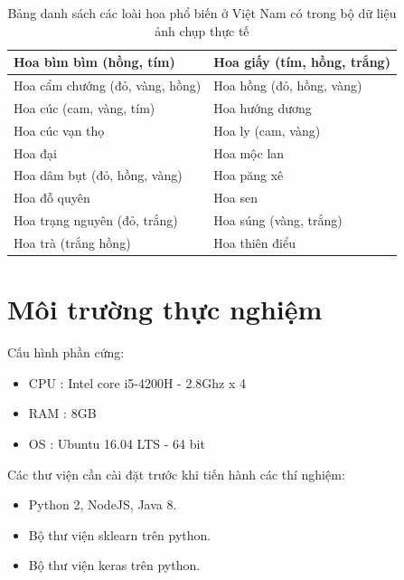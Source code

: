 \documentclass[12pt]{report}
\begin{document}
				
		\begin{table}[h]
			\centering
			\caption{Bảng danh sách các loài hoa phổ biến ở Việt Nam có trong bộ dữ liệu ảnh chụp thực tế}
			\label{tbl:table ket qua cua Nilsback08}
			\begin{tabular}{|l|l|}
				\hline
				Hoa bìm bìm (hồng, tím)               & Hoa giấy (tím, hồng, trắng) \\ \hline
				Hoa cẩm chướng (đỏ, vàng, hồng) & Hoa hồng (đỏ, hồng, vàng)  \\ \hline
				Hoa cúc (cam, vàng, tím)                & Hoa hướng dương        \\ \hline       
				Hoa cúc vạn thọ                       & Hoa ly (cam, vàng)           \\ \hline     
				Hoa đại                                 & Hoa mộc lan               \\ \hline       
				Hoa dâm bụt (đỏ, hồng, vàng)      & Hoa păng xê                     \\ \hline 
				Hoa đỗ quyên                         & Hoa sen                      \\ \hline      
				Hoa trạng nguyên (đỏ, trắng)       & Hoa súng (vàng, trắng)         \\ \hline
				Hoa trà (trắng hồng)                  & Hoa thiên điểu              \\ \hline   			
			\end{tabular}
		\end{table}

		\section{Môi trường thực nghiệm}
		Cấu hình phần cứng:
		\begin{itemize}
			\item CPU	: Intel core i5-4200H - 2.8Ghz x 4
			\item RAM	: 8GB
			\item OS	: Ubuntu 16.04 LTS - 64 bit
		\end{itemize}


		Các thư viện cần cài đặt trước khi tiến hành các thí nghiệm:

		\begin{itemize}
			\item Python 2, NodeJS, Java 8.
			\item Bộ thư viện sklearn trên python.
			\item Bộ thư viện keras trên python.
		\end{itemize}
		
\end{document}
